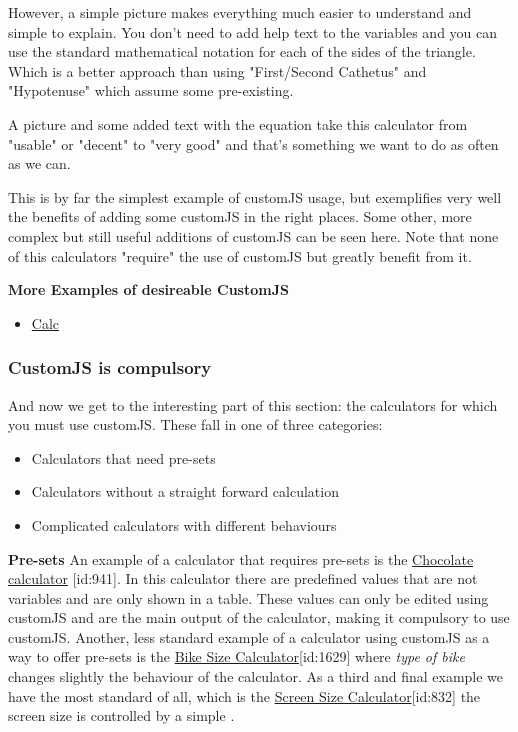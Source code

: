 However, a simple picture makes everything much easier to understand and simple to explain. You don't need to add help text to the variables and you can use the standard mathematical notation for each of the sides of the triangle. Which is a better approach than using "First/Second Cathetus" and "Hypotenuse" which assume some pre-existing. 

A picture and some added text with the equation take this calculator from "usable" or "decent" to "very good" and that's something we want to do as often as we can. 

This is by far the simplest example of customJS usage, but exemplifies very well the benefits of adding some customJS in the right places.  Some other, more complex but still useful additions of customJS can be seen here. Note that none of this calculators "require" the use of customJS but greatly benefit from it.

\textbf{More Examples of desireable CustomJS}
\begin{itemize}
    \item \href{url}{Calc}
\end{itemize}

\subsubsection{CustomJS is compulsory}
\label{subsub:compulsory}

And now we get to the interesting part of this section: the calculators for which you must use customJS. These fall in one of three categories:
\begin{itemize}
    \item Calculators that need pre-sets
    \item Calculators without a straight forward calculation
    \item Complicated calculators with different behaviours
\end{itemize}

\textbf{Pre-sets}
\label{calc:preset}
An example of a calculator that requires pre-sets is the \href{https://www.omnicalculator.com/food/chocolate}{Chocolate calculator} [id:941]. In this calculator there are predefined values that are not variables and are only shown in a table. These values can only be edited using customJS and are the main output of the calculator, making it compulsory to use customJS. Another, less standard example of a calculator using customJS as a way to offer pre-sets is the \href{https://www.omnicalculator.com/all/bike-size}{Bike Size Calculator}[id:1629] where \textit{type of bike} changes slightly the behaviour of the calculator. As a third and final example we have the most standard of all, which is the \href{https://www.omnicalculator.com/all/screen-size}{Screen Size Calculator}[id:832] the screen size is controlled by a simple . 

